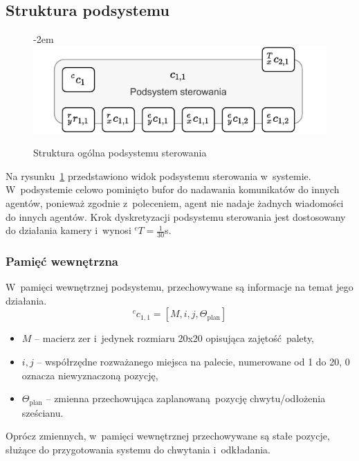 \subsection{Struktura podsystemu}
\label{subsec:cs-struktura}

\begin{figure}[ht]
    \leftskip-2em
    \includegraphics[width=1.15\columnwidth]{figures/ISR-cs-model.pdf}
    \caption{Struktura ogólna podsystemu sterowania}
    \label{fig:model-cs}
\end{figure}

Na rysunku~\ref{fig:model-cs} przedstawiono widok podsystemu sterowania w~systemie. W~podsystemie celowo pominięto bufor do nadawania komunikatów do innych agentów, ponieważ zgodnie z~poleceniem, agent nie nadaje żadnych wiadomości do innych agentów. Krok dyskretyzacji podsystemu sterowania jest dostosowany do działania kamery i~wynosi ${}^{c}T = \frac{1}{30}$s.

\subsubsection{Pamięć wewnętrzna}
W~pamięci wewnętrznej podsystemu, przechowywane są informacje na temat jego działania.
\begin{equation}
    {}^{c}c_{1,1} = [M, i, j, \Theta_{\mathrm{plan}}]
\end{equation}

\begin{itemize}
    \item $M$ -- macierz zer i~jedynek rozmiaru 20x20 opisująca zajętość palety,
    \item $i,j$ -- współrzędne rozważanego miejsca na palecie, numerowane od 1 do 20, 0 oznacza niewyznaczoną pozycję,
    \item $\Theta_{\mathrm{plan}}$ -- zmienna przechowująca zaplanowaną pozycję chwytu/odłożenia sześcianu.
\end{itemize}

Oprócz zmiennych, w~pamięci wewnętrznej przechowywane są stałe pozycje, służące do przygotowania systemu do chwytania i~odkładania.

